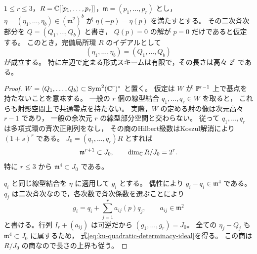 \begin{lemma}[少数変数の偶形式写像の二次有限決定性]
\label{lem:ku-even-quadratic-determinacy}
$1\le r\le3$，$R=\mathbb C[[p_1,\ldots,p_r]]$，$\mathfrak m=(p_1,\ldots,p_r)$ とし，
$\eta=(\eta_1,\ldots,\eta_b)\in(\mathfrak m^2)^b$ が
$\eta(-p)=\eta(p)$ を満たすとする。
その二次斉次部分を $Q=(Q_1,\ldots,Q_b)$ と書き，
$Q(p)=0$ の解が $p=0$ だけであると仮定する。
このとき，完備局所環 $R$ のイデアルとして
\begin{equation}\label{eq:ku-quadratic-determinacy-ideal}
 (\eta_1,\ldots,\eta_b)=(Q_1,\ldots,Q_b)
\end{equation}
が成立する。
特に左辺で定まる形式スキームは有限で，その長さは高々 $2^r$ である。
\end{lemma}
\begin{proof}
$W=\langle Q_1,\ldots,Q_b\rangle\subset\operatorname{Sym}^2(\mathbb C^r)^*$ と置く。
仮定は $W$ が $\mathbb P^{r-1}$ 上で基点を持たないことを意味する。
一般の $r$ 個の線型結合 $q_1,\ldots,q_r\in W$ を取ると，
これらも射影空間上で共通零点を持たない。
実際，$W$ の定める射の像は次元高々 $r-1$ であり，
一般の余次元 $r$ の線型部分空間と交わらない。
従って $q_1,\ldots,q_r$ は多項式環の斉次正則列をなし，
その商のHilbert級数はKoszul解消により $(1+s)^r$ である。
$J_0=(q_1,\ldots,q_r)R$ とすれば
\[
 \mathfrak m^{r+1}\subset J_0,\qquad
 \dim_{\mathbb C}R/J_0=2^r.
\]
特に $r\le3$ から $\mathfrak m^4\subset J_0$ である。

$q_i$ と同じ線型結合を $\eta$ に適用して $g_i$ とする。
偶性により $g_i-q_i\in\mathfrak m^4$ である。
$q_j$ は二次斉次なので，各次数で斉次係数を選ぶことにより
\[
 g_i=q_i+\sum_{j=1}^r a_{ij}(p)q_j,
 \qquad a_{ij}\in\mathfrak m^2
\]
と書ける。行列 $I_r+(a_{ij})$ は可逆だから $(g_1,\ldots,g_r)=J_0$。
全ての $\eta_j-Q_j$ も $\mathfrak m^4\subset J_0$ に属するため，
式\eqref{eq:ku-quadratic-determinacy-ideal}を得る。
この商は $R/J_0$ の商なので長さの上界も従う。
\end{proof}

